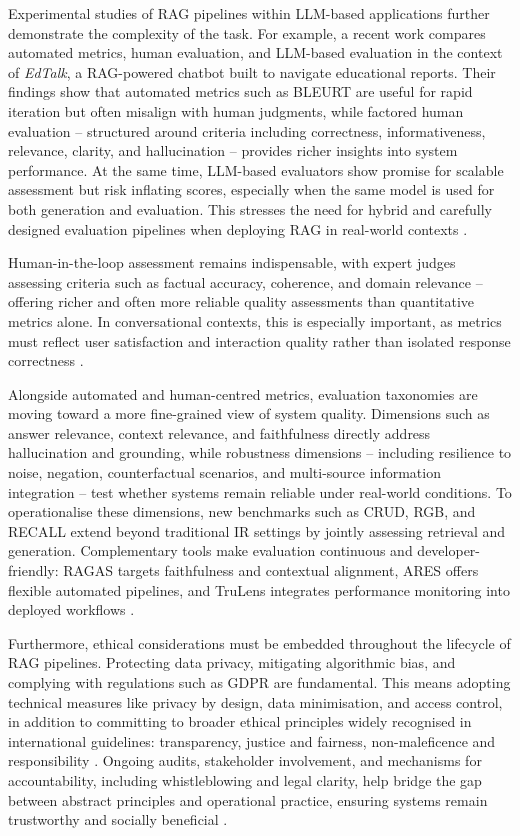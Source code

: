 \begin{spacing}{1.5}
Experimental studies of RAG pipelines within LLM-based applications further demonstrate the complexity of the task. For example, a recent work compares automated metrics, human evaluation, and LLM-based evaluation in the context of \textit{EdTalk}, a RAG-powered chatbot built to navigate educational reports. Their findings show that automated metrics such as BLEURT are useful for rapid iteration but often misalign with human judgments, while factored human evaluation -- structured around criteria including correctness, informativeness, relevance, clarity, and hallucination -- provides richer insights into system performance. At the same time, LLM-based evaluators show promise for scalable assessment but risk inflating scores, especially when the same model is used for both generation and evaluation. This stresses the need for hybrid and carefully designed evaluation pipelines when deploying RAG in real-world contexts \citep{abeysinghe_challenges_2024}.

Human-in-the-loop assessment remains indispensable, with expert judges assessing criteria such as factual accuracy, coherence, and domain relevance -- offering richer and often more reliable quality assessments than quantitative metrics alone. In conversational contexts, this is especially important, as metrics must reflect user satisfaction and interaction quality rather than isolated response correctness \citep{gupta_comprehensive_2024}.

Alongside automated and human-centred metrics, evaluation taxonomies are moving toward a more fine-grained view of system quality. Dimensions such as answer relevance, context relevance, and faithfulness directly address hallucination and grounding, while robustness dimensions -- including resilience to noise, negation, counterfactual scenarios, and multi-source information integration -- test whether systems remain reliable under real-world conditions. To operationalise these dimensions, new benchmarks such as CRUD, RGB, and RECALL extend beyond traditional IR settings by jointly assessing retrieval and generation. Complementary tools make evaluation continuous and developer-friendly: RAGAS targets faithfulness and contextual alignment, ARES offers flexible automated pipelines, and TruLens integrates performance monitoring into deployed workflows \citep{gao_retrieval-augmented_2024}.

Furthermore, ethical considerations must be embedded throughout the lifecycle of RAG pipelines. Protecting data privacy, mitigating algorithmic bias, and complying with regulations such as GDPR are fundamental. This means adopting technical measures like privacy by design, data minimisation, and access control, in addition to committing to broader ethical principles widely recognised in international guidelines: transparency, justice and fairness, non-maleficence and responsibility \citep{jobin_global_2019}. Ongoing audits, stakeholder involvement, and mechanisms for accountability, including whistleblowing and legal clarity, help bridge the gap between abstract principles and operational practice, ensuring systems remain trustworthy and socially beneficial \citep{ashery_emergent_2025}.


\end{spacing}
